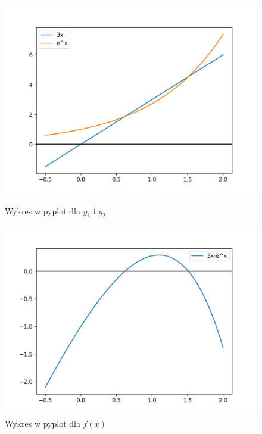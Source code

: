 \documentclass[12pt]{article}
\begin{document}
\begin{figure}[!h]
  \includegraphics[width=\linewidth]{zad5_a_plot.png}
  \caption{Wykres w pyplot dla $y_1$ i $y_2$}\label{fig:figure2}
\endminipage\hfill
{}
  \includegraphics[width=\linewidth]{zad5_b_plot.png}
  \caption{Wykres w pyplot dla $f(x)$}\label{fig:figure3}
\endminipage
\end{figure}
\end{document}
